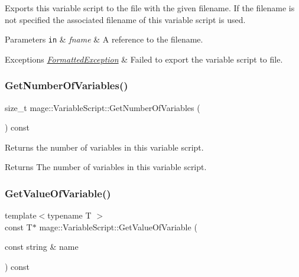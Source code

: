 Exports this variable script to the file with the given filename. If the filename is not specified the associated filename of this variable script is used.


\begin{DoxyParams}[1]{Parameters}
\mbox{\tt in}  & {\em fname} & A reference to the filename. \\
\hline
\end{DoxyParams}

\begin{DoxyExceptions}{Exceptions}
{\em \hyperlink{structmage_1_1_formatted_exception}{Formatted\+Exception}} & Failed to export the variable script to file. \\
\hline
\end{DoxyExceptions}
\hypertarget{classmage_1_1_variable_script_aea9aaa1659bceca4d22b9ab4ba4aba7a}{}\label{classmage_1_1_variable_script_aea9aaa1659bceca4d22b9ab4ba4aba7a} 
\subsubsection{\texorpdfstring{Get\+Number\+Of\+Variables()}{GetNumberOfVariables()}}
{\footnotesize\ttfamily size\+\_\+t mage\+::\+Variable\+Script\+::\+Get\+Number\+Of\+Variables (\begin{DoxyParamCaption}{ }\end{DoxyParamCaption}) const\hspace{0.3cm}{\ttfamily [noexcept]}}

Returns the number of variables in this variable script.

\begin{DoxyReturn}{Returns}
The number of variables in this variable script. 
\end{DoxyReturn}
\hypertarget{classmage_1_1_variable_script_a231b83e1e32b882489ed90faa69f7137}{}\label{classmage_1_1_variable_script_a231b83e1e32b882489ed90faa69f7137} 
\subsubsection{\texorpdfstring{Get\+Value\+Of\+Variable()}{GetValueOfVariable()}}
{\footnotesize\ttfamily template$<$typename T $>$ \\
const T$\ast$ mage\+::\+Variable\+Script\+::\+Get\+Value\+Of\+Variable (\begin{DoxyParamCaption}\item[{const string \&}]{name }\end{DoxyParamCaption}) const}

